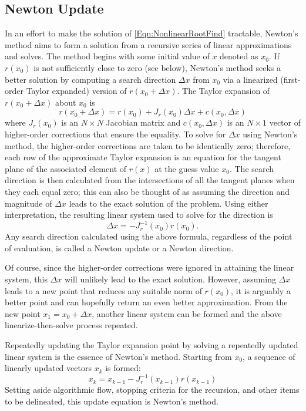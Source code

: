 \documentclass[Prelim,12pt]{WisconsinThesis}
\newcommand{\by}    {\!\times\!}
\begin{document}
\subsection{Newton Update}
In an effort to make the solution of \cref{Eqn:NonlinearRootFind} tractable, Newton's method aims to form a solution from a recursive series of linear approximations and solves.
The method begins with some initial value of $x$ denoted as $x_0$.
If $r(x_0)$ is not sufficiently close to zero (see below), Newton's method seeks a better solution by computing a search direction $\Delta{x}$ from $x_0$ via a linearized (first-order Taylor expanded) version of $r(x_0 + \Delta{x})$.
The Taylor expansion of $r(x_0 + \Delta{x})$ about $x_0$ is
\begin{equation}
    r(x_0 + \Delta{x}) =  r(x_0) + J_r(x_0)\Delta{x} + c(x_0,\Delta{x})
\end{equation}
where $J_r(x_0)$ is an $N \by N$ Jacobian matrix and $c(x_0,\Delta{x})$ is an $N \by 1$ vector of higher-order corrections that ensure the equality.
To solve for $\Delta{x}$ using Newton's method, the higher-order corrections are taken to be identically zero; therefore, each row of the approximate Taylor expansion is an equation for the tangent plane of the associated element of $r(x)$ at the guess value $x_0$.
The search direction is then calculated from the intersections of all the tangent planes when they each equal zero; this can also be thought of as assuming the direction and magnitude of $\Delta{x}$ leads to the exact solution of the problem.
Using either interpretation, the resulting linear system used to solve for the direction is
\begin{equation}
    \Delta{x} = - J_{r}^{-1}(x_0) r(x_0).
\end{equation}
Any search direction calculated using the above formula, regardless of the point of evaluation, is called a Newton update or a Newton direction.

Of course, since the higher-order corrections were ignored in attaining the linear system, this $\Delta{x}$ will unlikely lead to the exact solution.
However, assuming $\Delta{x}$ leads to a new point that reduces any suitable norm of $r(x_0)$, it is arguably a better point and can hopefully return an even better approximation.
From the new point $x_1 = x_0 + \Delta{x}$, another linear system can be formed and the above linearize-then-solve process repeated.

Repeatedly updating the Taylor expansion point by solving a repeatedly updated linear system is the essence of Newton's method.
Starting from $x_0$, a sequence of linearly updated vectors $x_k$ is formed:
\begin{equation}
    x_k = x_{k-1} - J_r^{-1}(x_{k-1}) r(x_{k-1})
\end{equation}
Setting aside algorithmic flow, stopping criteria for the recursion, and other items to be delineated, this update equation is Newton's method.
\end{document}

